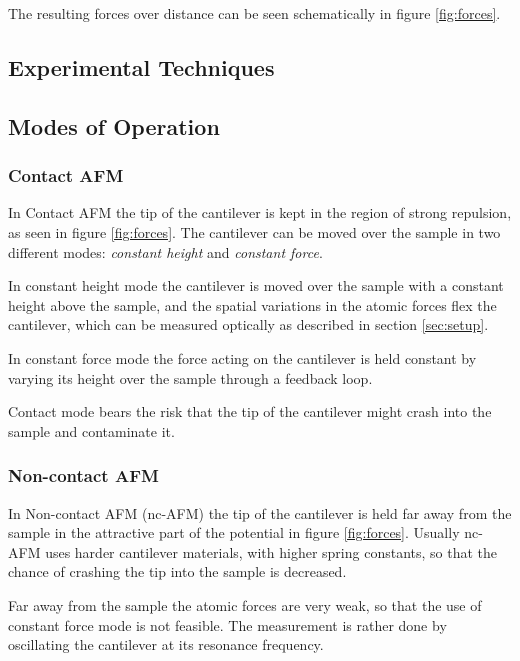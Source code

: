 \documentclass[a4paper,twoside,11pt]{scrartcl}
\begin{document}
The resulting forces over distance can be seen schematically in figure \ref{fig:forces}.

\subsection{Experimental Techniques}

\subsection{Modes of Operation}

\subsubsection{Contact AFM}

In Contact AFM the tip of the cantilever is kept in the region of strong repulsion, as seen in figure \ref{fig:forces}. The cantilever can be moved over the sample in two different modes: \textit{constant height} and \textit{constant force}.

In constant height mode the cantilever is moved over the sample with a constant height above the sample, and the spatial variations in the atomic forces flex the cantilever, which can be measured optically as described in section \ref{sec:setup}.

In constant force mode the force acting on the cantilever is held constant by varying its height over the sample through a feedback loop.

Contact mode bears the risk that the tip of the cantilever might crash into the sample and contaminate it.

\subsubsection{Non-contact AFM}

In Non-contact AFM (nc-AFM) the tip of the cantilever is held far away from the sample in the attractive part of the potential in figure \ref{fig:forces}. Usually nc-AFM uses harder cantilever materials, with higher spring constants, so that the chance of crashing the tip into the sample is decreased.

Far away from the sample the atomic forces are very weak, so that the use of constant force mode is not feasible. The measurement is rather done by oscillating the cantilever at its resonance frequency.
\end{document}
